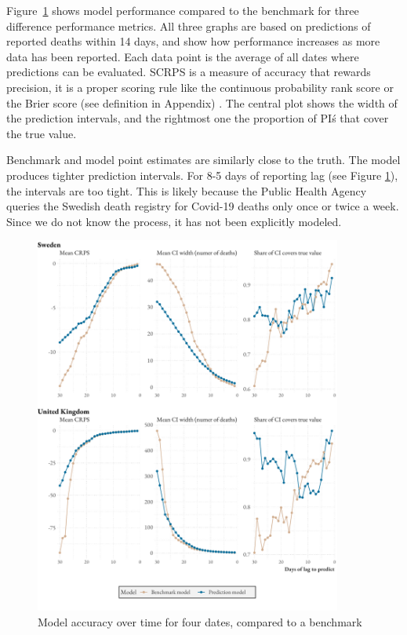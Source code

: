 \documentclass[a4paper,11pth]{article}
\begin{document}
Figure~\ref{fig:model_metrics} shows model performance compared to the benchmark for three difference performance metrics. All three graphs are based on predictions of reported deaths within 14 days, and show how performance increases as more data has been reported. Each data point is the average of all dates where predictions can be evaluated. SCRPS is a measure of accuracy that rewards precision, it is a proper scoring rule like the continuous probability rank score or the Brier score (see definition in Appendix) \citep{bolin2019scale}. The central plot shows the width of the prediction intervals, and the rightmost one the proportion of PI\'s that cover the true value.

Benchmark and model point estimates are similarly close to the truth. The model produces tighter prediction intervals. For 8-5 days of reporting lag (see Figure \ref{fig:model_metrics}), the intervals are too tight. This is likely because the Public Health Agency queries the Swedish death registry for Covid-19 deaths only once or twice a week. Since we do not know the process, it has not been explicitly modeled.

\begin{figure}
    \centering
    \includegraphics[width=0.9\textwidth]{plots/model_metrics}
    \caption{Model accuracy over time for four dates, compared to a benchmark}
    \label{fig:model_metrics}
\end{figure}
\end{document}

